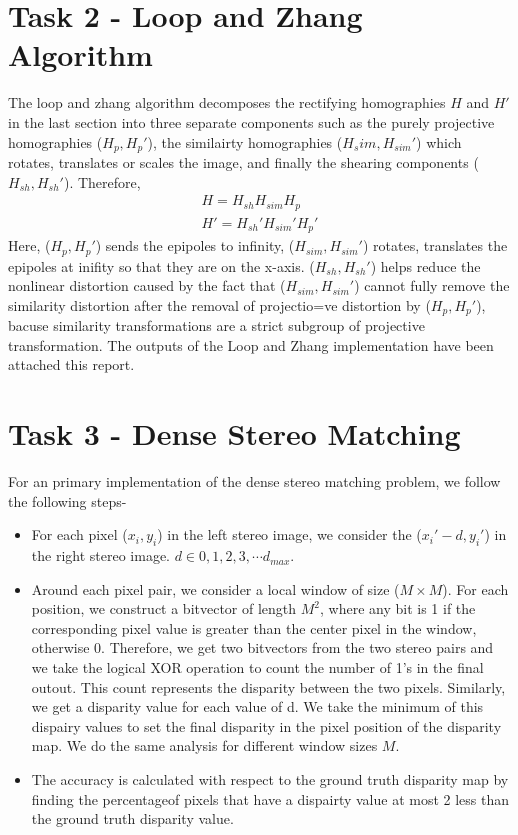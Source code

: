 \documentclass{article}
\begin{document}
\section{Task 2 - Loop and Zhang Algorithm}
The loop and zhang algorithm decomposes the rectifying homographies $H$ and $H'$ in the last section into three separate components such as the purely projective homographies ($H_p,H_p'$), the similairty homographies ($H_sim,H_{sim}'$) which rotates, translates or scales the image, and finally the shearing components ($H_{sh},H_{sh}'$). Therefore,
\begin{eqnarray}
	H = H_{sh}H_{sim}H_p\\
	H' = H_{sh}'H_{sim}'H_p'
\end{eqnarray}
Here, ($H_p,H_p'$) sends the epipoles to infinity, ($H_{sim},H_{sim}'$) rotates, translates the epipoles at inifity so that they are on the x-axis. ($H_{sh},H_{sh}'$) helps reduce the nonlinear distortion caused by the fact that ($H_{sim},H_{sim}'$) cannot fully remove the similarity distortion after the removal of projectio=ve distortion by ($H_p,H_p'$), bacuse similarity transformations are a strict subgroup of projective transformation. The outputs of the Loop and Zhang implementation have been attached this report.

\section{Task 3 - Dense Stereo Matching}
For an primary implementation of the dense stereo matching problem, we follow the following steps-
\begin{itemize}
\item For each pixel ($x_i,y_i$) in the left stereo image, we consider the ($x_i'-d,y_i'$) in the right stereo image. $d \in {0,1,2,3,\cdots d_{max}}$.
\item Around each pixel pair, we consider a local window of size ($M\times M$). For each position, we construct a bitvector of length $M^2$, where any bit is 1 if the corresponding pixel value is greater than the center pixel in the window, otherwise 0. Therefore, we get two bitvectors from the two stereo pairs and we take the logical XOR operation to count the number of 1's in the final outout. This count represents the disparity between the two pixels. Similarly, we get a disparity value for each value of d. We take the minimum of this dispairy values to set the final disparity in the pixel position of the disparity map. We do the same analysis for different window sizes $M$.
\item The accuracy is calculated with respect to the ground truth disparity map by finding the percentageof pixels that have a dispairty value at most 2 less than the ground truth disparity value.
\end{itemize}
\end{document}
